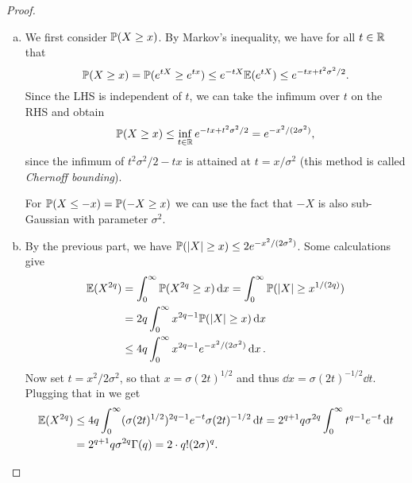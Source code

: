 \begin{proof}
    \begin{enumerate}[(a)]
        \item We first consider $\mathbb P(X \geq x)$. 
        By Markov's inequality, we have for all $t \in \mathbb R$ that
        \[
        \mathbb P(X \geq x) = \mathbb P(e^{tX} \geq e^{tx}) \leq e^{-tX} \mathbb E(e^{tX}) \leq e^{-tx + t^2\sigma^2/2}.  
        \]
        Since the LHS is independent of $t$, we can take the infimum over $t$ on the RHS and obtain
        \[
        \mathbb P(X \geq x) \leq \inf_{t \in \mathbb R} e^{-tx + t^2\sigma^2/2} = e^{-x^2/(2\sigma^2)}, 
        \]
        since the infimum of $t^2\sigma^2/2 - tx$ is attained at $t = x/\sigma^2$ (this method is called \emph{Chernoff bounding}). 
        
        For $\mathbb P(X \leq -x) = \mathbb P(-X \geq x)$ we can use the fact that $-X$ is also sub-Gaussian with parameter $\sigma^2$. 
        
        \item By the previous part, we have $\mathbb P(\abs{X} \geq x) \leq 2 e^{-x^2/(2\sigma^2)}$. Some calculations give
        \begin{align*}
            \mathbb E(X^{2q}) &= \int_0^\infty \mathbb P(X^{2q} \geq x) \dd{x} = \int_0^\infty \mathbb P(\abs{X} \geq x^{1/(2q)}) \\
            &= 2q \int_0^\infty x^{2q - 1} \mathbb P(\abs{X}\geq x)\dd{x} \\
             &\leq 4q \int_0^\infty x^{2q - 1} e^{-x^2/(2\sigma^2)} \dd{x}.
        \end{align*}
    Now set $t = x^2/2\sigma^2$, so that $x = \sigma (2t)^{1/2}$ and thus $\dd{x} = \sigma (2t)^{-1/2} \dd{t}$. Plugging that in we get
    \begin{align*}
    \mathbb E(X^{2q}) &\leq 4q \int_0^\infty (\sigma(2t)^{1/2})^{2q - 1} e^{-t} \sigma (2t)^{-1/2} \dd{t} = 2^{q+1} q \sigma^{2q} \int_0^\infty t^{q-1} e^{-t} \dd{t} \\
    &= 2^{q+1} q \sigma^{2q} \Gamma(q) = 2 \cdot q! (2\sigma)^q. 
    \end{align*}


\end{enumerate}
\end{proof}
